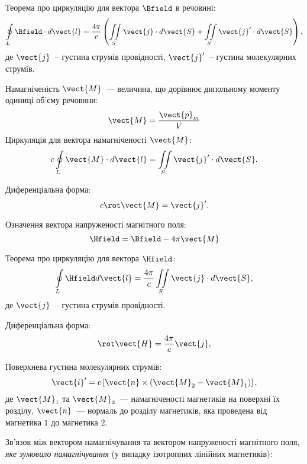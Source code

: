\begin{Theory}\small

  Теорема про циркуляцію для вектора $\Bfield$ в речовині:
  \begin{equation}
	  \oint\limits_{L} \Bfield\cdot d\vect{l} = \frac{4\pi}{c}\left( \iint\limits_S \vect{j} \cdot d\vect{S} + \iint\limits_S \vect{j}'\cdot d\vect{S}\right) ,
  \end{equation}
  де $\vect{j}$~-- густина струмів провідності,  $\vect{j}'$~-- густина молекулярних струмів.

  Намагніченість $\vect{M}$~--- величина, що дорівнює дипольному моменту одиниці об'єму речовини:
	\begin{equation}
		\vect{M} = \frac{\vect{p}_m}{V}
	\end{equation}
  Циркуляція для вектора намагніченості $\vect{M}$:
  \begin{equation}
	  c\oint\limits_{L} \vect{M} \cdot d\vect{l} = \iint\limits_S \vect{j}' \cdot d\vect{S}.
  \end{equation}

  Диференціальна форма:
  \begin{equation}
	  c\rot\vect{M} = \vect{j}'.
  \end{equation}


  Означення вектора напруженості магнітного поля:
  \begin{equation}
	  \Hfield = \Bfield - 4\pi\vect{M}
  \end{equation}

  Теорема про циркуляцію для вектора $\Hfield$:
  \begin{equation}
	  \oint\limits_{L} \Hfield d\vect{l} = \frac{4\pi}{c}\iint\limits_S \vect{j} \cdot d\vect{S},
  \end{equation}
де $\vect{j}$~-- густина струмів провідності.

Диференціальна форма:
  \begin{equation}
	  \rot\vect{H} = \frac{4\pi}{c}\vect{j},
  \end{equation}

Поверхнева густина молекулярних струмів:
\begin{equation}
	\vect{i}' = c\left[\vect{n}\times(\vect{M}_2 - \vect{M}_1) \right],
\end{equation}
де $\vect{M}_1$ та $\vect{M}_2$~--- намагніченості магнетиків на поверхні їх розділу, $\vect{n}$~--- нормаль до розділу магнетиків, яка проведена від магнетика $1$ до магнетика $2$.

  Зв'язок між вектором намагнічування та вектором напруженості магнітного поля, \emph{яке зумовило намагнічування} (у випадку ізотропних лінійних магнетиків):


\end{Theory}
